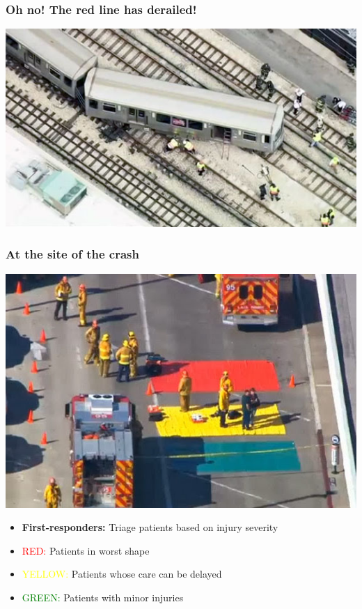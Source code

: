 \documentclass{beamer}
\begin{document}
\begin{frame}
  \frametitle{Oh no! The red line has derailed!}
  \includegraphics[width=1\textwidth]{train_derailed}
\end{frame}

\begin{frame}
  \frametitle{At the site of the crash}
  \begin{minipage}[c]{.45\textwidth}
    \includegraphics[width=1\textwidth]{EMSTriage}
  \end{minipage}
  \begin{minipage}[c]{.45\textwidth}
    \begin{itemize}
      \item \textbf{First-responders:} Triage patients based on injury severity
      \item \textcolor{red}{RED:} Patients in worst shape
      \item \textcolor{yellow}{YELLOW:} Patients whose care can be delayed
      \item \textcolor{green}{GREEN:} Patients with minor injuries
    \end{itemize}
  \end{minipage}
\end{frame}
\end{document}
